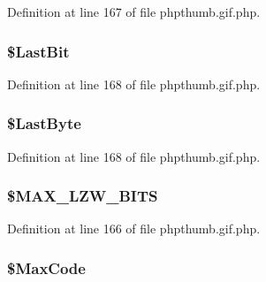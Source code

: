 \-Definition at line 167 of file phpthumb.\-gif.\-php.

\hypertarget{class_c_g_i_f_l_z_w_a88ba4821aecd26b957e9c3217cba7392}{
\subsubsection[{\$\-Last\-Bit}]{\setlength{\rightskip}{0pt plus 5cm}\$\-Last\-Bit}}\label{class_c_g_i_f_l_z_w_a88ba4821aecd26b957e9c3217cba7392}


\-Definition at line 168 of file phpthumb.\-gif.\-php.

\hypertarget{class_c_g_i_f_l_z_w_af76dc867120a1e953942179dd45b877f}{
\subsubsection[{\$\-Last\-Byte}]{\setlength{\rightskip}{0pt plus 5cm}\$\-Last\-Byte}}\label{class_c_g_i_f_l_z_w_af76dc867120a1e953942179dd45b877f}


\-Definition at line 168 of file phpthumb.\-gif.\-php.

\hypertarget{class_c_g_i_f_l_z_w_a881d5405e02095f174faf98b497022fc}{
\subsubsection[{\$\-M\-A\-X\-\_\-\-L\-Z\-W\-\_\-\-B\-I\-T\-S}]{\setlength{\rightskip}{0pt plus 5cm}\$\-M\-A\-X\-\_\-\-L\-Z\-W\-\_\-\-B\-I\-T\-S}}\label{class_c_g_i_f_l_z_w_a881d5405e02095f174faf98b497022fc}


\-Definition at line 166 of file phpthumb.\-gif.\-php.

\hypertarget{class_c_g_i_f_l_z_w_a474cbbba5a21c60ad740f1ac22b74875}{
\subsubsection[{\$\-Max\-Code}]{\setlength{\rightskip}{0pt plus 5cm}\$\-Max\-Code}}\label{class_c_g_i_f_l_z_w_a474cbbba5a21c60ad740f1ac22b74875}


